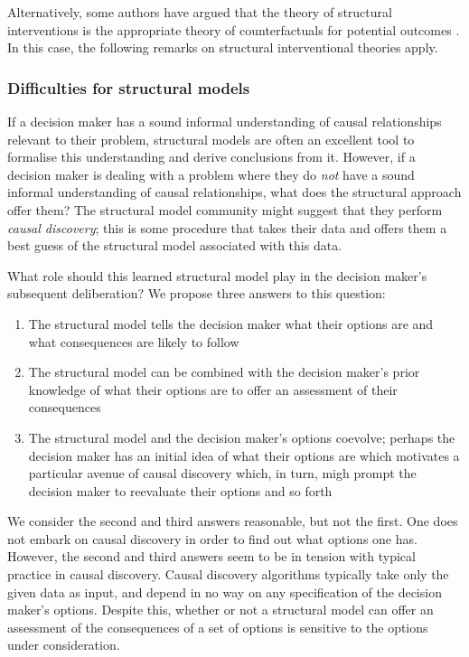 Alternatively, some authors have argued that the theory of structural interventions is the appropriate theory of counterfactuals for potential outcomes \citep[chap. ~7]{pearl_causality:_2009}. In this case, the following remarks on structural interventional theories apply.

\subsubsection{Difficulties for structural models}

If a decision maker has a sound informal understanding of causal relationships relevant to their problem, structural models are often an excellent tool to formalise this understanding and derive conclusions from it. However, if a decision maker is dealing with a problem where they do \emph{not} have a sound informal understanding of causal relationships, what does the structural approach offer them? The structural model community might suggest that they perform \emph{causal discovery}; this is some procedure that takes their data and offers them a best guess of the structural model associated with this data.

What role should this learned structural model play in the decision maker's subsequent deliberation? We propose three answers to this question:
\begin{enumerate}
    \item The structural model tells the decision maker what their options are and what consequences are likely to follow
    \item The structural model can be combined with the decision maker's prior knowledge of what their options are to offer an assessment of their consequences
    \item The structural model and the decision maker's options coevolve; perhaps the decision maker has an initial idea of what their options are which motivates a particular avenue of causal discovery which, in turn, migh prompt the decision maker to reevaluate their options and so forth
\end{enumerate}

We consider the second and third answers reasonable, but not the first. One does not embark on causal discovery in order to find out what options one has. However, the second and third answers seem to be in tension with typical practice in causal discovery. Causal discovery algorithms typically take only the given data as input, and depend in no way on any specification of the decision maker's options. Despite this, whether or not a structural model can offer an assessment of the consequences of a set of options is sensitive to the options under consideration.

